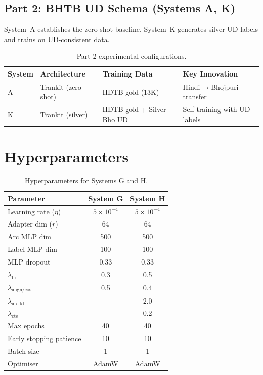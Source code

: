 \documentclass[12pt,a4paper,oneside]{report}
\begin{document}
\subsection{Part 2: BHTB UD Schema (Systems A, K)}

System~A establishes the zero-shot baseline. System~K generates silver UD labels and
trains on UD-consistent data.

\begin{table}[ht]
\centering
\caption{Part 2 experimental configurations.}
\label{tab:comp2_configs}
\begin{tabular}{@{}llll@{}}
\toprule
\textbf{System} & \textbf{Architecture} & \textbf{Training Data} & \textbf{Key Innovation} \\
\midrule
A & Trankit (zero-shot) & HDTB gold (13K) & Hindi$\to$Bhojpuri transfer \\
K & Trankit (silver) & HDTB gold + Silver Bho UD & Self-training with UD labels \\
\bottomrule
\end{tabular}
\end{table}

\section{Hyperparameters}

\begin{table}[ht]
\centering
\caption{Hyperparameters for Systems G and H.}
\label{tab:hyperparams}
\begin{tabular}{@{}lcc@{}}
\toprule
\textbf{Parameter} & \textbf{System G} & \textbf{System H} \\
\midrule
Learning rate ($\eta$)        & $5\times10^{-4}$ & $5\times10^{-4}$ \\
Adapter dim ($r$)             & 64 & 64 \\
Arc MLP dim                   & 500 & 500 \\
Label MLP dim                 & 100 & 100 \\
MLP dropout                   & 0.33 & 0.33 \\
$\lambda_{\text{hi}}$         & 0.3 & 0.5 \\
$\lambda_{\text{align/cos}}$  & 0.5 & 0.4 \\
$\lambda_{\text{arc-kl}}$     & ---   & 2.0 \\
$\lambda_{\text{cts}}$        & ---   & 0.2 \\
Max epochs                    & 40 & 40 \\
Early stopping patience       & 10 & 10 \\
Batch size                    & 1 & 1 \\
Optimiser                     & AdamW & AdamW \\
\bottomrule
\end{tabular}
\end{table}
\end{document}
